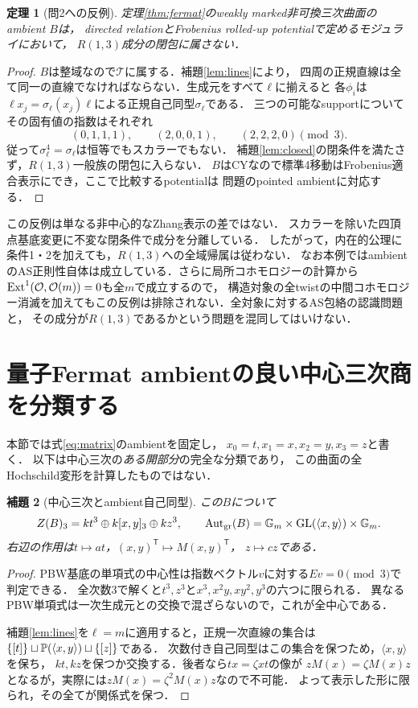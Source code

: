 \documentclass[11pt,a4paper]{ltjsarticle}
\newtheorem{theorem}{定理}[section]
\newtheorem{lemma}[theorem]{補題}
\theoremstyle{definition}\newtheorem{definition}[theorem]{定義}
\newcommand{\OO}{\mathcal O}\newcommand{\cA}{\mathcal A}
\begin{document}
\begin{theorem}[問2への反例]\label{thm:not-r13}
定理\ref{thm:fermat}のweakly marked非可換三次曲面のambient $B$は，
directed relationとFrobenius rolled-up potentialで定めるモジュライにおいて，
$R(1,3)$成分の閉包に属さない．
\end{theorem}
\begin{proof}
$B$は整域なので$\mathcal T$に属する．補題\ref{lem:lines}により，
四周の正規直線は全て同一の直線でなければならない．生成元をすべて$\ell$に揃えると
各$\phi_i$は$\ell x_j=\sigma_\ell(x_j)\ell$による正規自己同型$\sigma_\ell$である．
三つの可能なsupportについてその固有値の指数はそれぞれ
\[
 (0,1,1,1),\qquad(2,0,0,1),\qquad(2,2,2,0)\pmod3.
\]
従って$\sigma_\ell^4=\sigma_\ell$は恒等でもスカラーでもない．
補題\ref{lem:closed}の閉条件を満たさず，$R(1,3)$一般族の閉包に入らない．
$B$はCYなので標準4移動はFrobenius適合表示にでき，ここで比較するpotentialは
問題のpointed ambientに対応する．
\end{proof}
この反例は単なる非中心的なZhang表示の差ではない．
スカラーを除いた四頂点基底変更に不変な閉条件で成分を分離している．
したがって，内在的公理に条件1・2を加えても，$R(1,3)$への全域帰属は従わない．
なお本例ではambientのAS正則性自体は成立している．さらに局所コホモロジーの計算から
$\Ext^1(\OO,\OO(m))=0$も全$m$で成立するので，
構造対象の全twistの中間コホモロジー消滅を加えてもこの反例は排除されない．全対象に対するAS包絡の認識問題と，
その成分が$R(1,3)$であるかという問題を混同してはいけない．


\section{量子Fermat ambientの良い中心三次商を分類する}
\label{sec:fermat-fibre}
本節では式\eqref{eq:matrix}のambientを固定し，
$x_0=t,x_1=x,x_2=y,x_3=z$と書く．
以下は中心三次の\emph{ある開部分}の完全な分類であり，
この曲面の全Hochschild変形を計算したものではない．

\begin{lemma}[中心三次とambient自己同型]\label{lem:fermat-aut}
この$B$について
\[
 Z(B)_3=kt^3\oplus k[x,y]_3\oplus kz^3,
 \qquad \operatorname{Aut}_{\mathrm{gr}}(B)
     =\mathbb G_m\times\operatorname{GL}(\langle x,y\rangle)\times\mathbb G_m.
\]
右辺の作用は$t\mapsto at$，$(x,y)^{\mathsf T}\mapsto M(x,y)^{\mathsf T}$，
$z\mapsto cz$である．
\end{lemma}
\begin{proof}
PBW基底の単項式の中心性は指数ベクトル$v$に対する$Ev=0\pmod3$で判定できる．
全次数3で解くと$t^3,z^3$と$x^3,x^2y,xy^2,y^3$の六つに限られる．
異なるPBW単項式は一次生成元との交換で混ざらないので，これが全中心である．

補題\ref{lem:lines}を$\ell=m$に適用すると，正規一次直線の集合は
$\{[t]\}\sqcup\mathbb P(\langle x,y\rangle)\sqcup\{[z]\}$である．
次数付き自己同型はこの集合を保つため，$\langle x,y\rangle$を保ち，
$kt,kz$を保つか交換する．後者なら$tx=\zeta xt$の像が
$zM(x)=\zeta M(x)z$となるが，実際には$zM(x)=\zeta^2M(x)z$なので不可能．
よって表示した形に限られ，その全てが関係式を保つ．
\end{proof}
\end{document}
